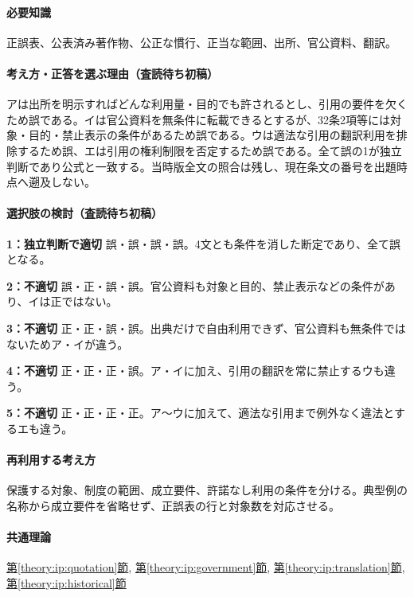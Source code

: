 \paragraph{必要知識} 正誤表、公表済み著作物、公正な慣行、正当な範囲、出所、官公資料、翻訳。

\paragraph{考え方・正答を選ぶ理由（査読待ち初稿）} アは出所を明示すればどんな利用量・目的でも許されるとし、引用の要件を欠くため誤である。イは官公資料を無条件に転載できるとするが、32条2項等には対象・目的・禁止表示の条件があるため誤である。ウは適法な引用の翻訳利用を排除するため誤、エは引用の権利制限を否定するため誤である。全て誤の1が独立判断であり公式と一致する。当時版全文の照合は残し、現在条文の番号を出題時点へ遡及しない。

\paragraph{選択肢の検討（査読待ち初稿）}\mbox{}\par

\noindent\textbf{1：独立判断で適切} 誤・誤・誤・誤。4文とも条件を消した断定であり、全て誤となる。\par

\noindent\textbf{2：不適切} 誤・正・誤・誤。官公資料も対象と目的、禁止表示などの条件があり、イは正ではない。\par

\noindent\textbf{3：不適切} 正・正・誤・誤。出典だけで自由利用できず、官公資料も無条件ではないためア・イが違う。\par

\noindent\textbf{4：不適切} 正・正・正・誤。ア・イに加え、引用の翻訳を常に禁止するウも違う。\par

\noindent\textbf{5：不適切} 正・正・正・正。ア〜ウに加えて、適法な引用まで例外なく違法とするエも違う。\par

\paragraph{再利用する考え方} 保護する対象、制度の範囲、成立要件、許諾なし利用の条件を分ける。典型例の名称から成立要件を省略せず、正誤表の行と対象数を対応させる。

\paragraph{共通理論} \hyperref[theory:ip:quotation]{第\ref*{theory:ip:quotation}節}, \hyperref[theory:ip:government]{第\ref*{theory:ip:government}節}, \hyperref[theory:ip:translation]{第\ref*{theory:ip:translation}節}, \hyperref[theory:ip:historical]{第\ref*{theory:ip:historical}節}

